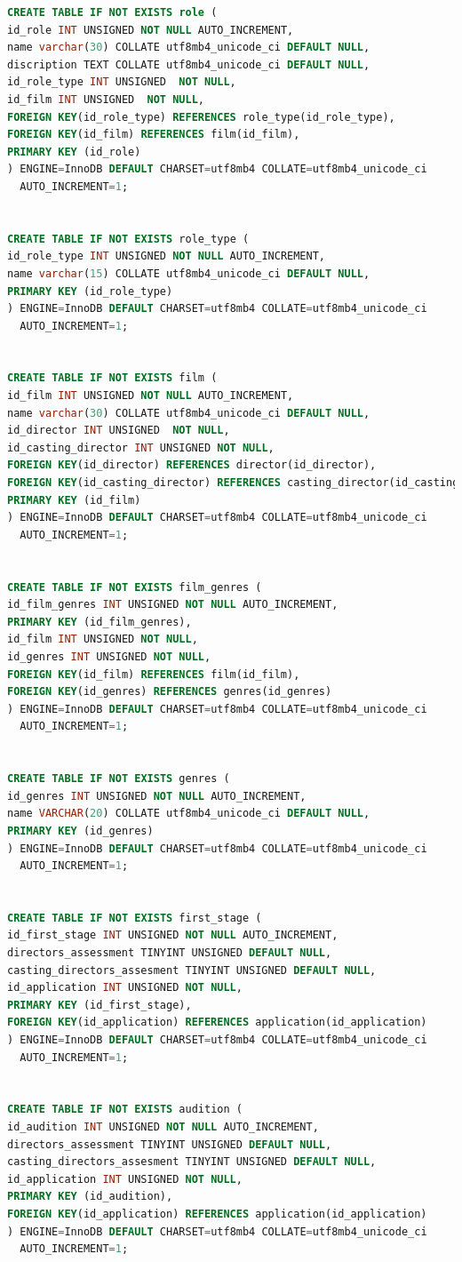 \documentclass[11pt,a4paper,final]{article} %
\begin{document}
\begin{lstlisting}[language=SQL]
CREATE TABLE IF NOT EXISTS role (
id_role INT UNSIGNED NOT NULL AUTO_INCREMENT,
name varchar(30) COLLATE utf8mb4_unicode_ci DEFAULT NULL,
discription TEXT COLLATE utf8mb4_unicode_ci DEFAULT NULL,
id_role_type INT UNSIGNED  NOT NULL, 
id_film INT UNSIGNED  NOT NULL, 
FOREIGN KEY(id_role_type) REFERENCES role_type(id_role_type),
FOREIGN KEY(id_film) REFERENCES film(id_film), 
PRIMARY KEY (id_role)
) ENGINE=InnoDB DEFAULT CHARSET=utf8mb4 COLLATE=utf8mb4_unicode_ci 
  AUTO_INCREMENT=1;


CREATE TABLE IF NOT EXISTS role_type (
id_role_type INT UNSIGNED NOT NULL AUTO_INCREMENT,
name varchar(15) COLLATE utf8mb4_unicode_ci DEFAULT NULL,
PRIMARY KEY (id_role_type)
) ENGINE=InnoDB DEFAULT CHARSET=utf8mb4 COLLATE=utf8mb4_unicode_ci   
  AUTO_INCREMENT=1;	


CREATE TABLE IF NOT EXISTS film (
id_film INT UNSIGNED NOT NULL AUTO_INCREMENT,
name varchar(30) COLLATE utf8mb4_unicode_ci DEFAULT NULL,
id_director INT UNSIGNED  NOT NULL, 
id_casting_director INT UNSIGNED NOT NULL,
FOREIGN KEY(id_director) REFERENCES director(id_director),
FOREIGN KEY(id_casting_director) REFERENCES casting_director(id_casting_director), 
PRIMARY KEY (id_film)
) ENGINE=InnoDB DEFAULT CHARSET=utf8mb4 COLLATE=utf8mb4_unicode_ci 
  AUTO_INCREMENT=1;


CREATE TABLE IF NOT EXISTS film_genres (
id_film_genres INT UNSIGNED NOT NULL AUTO_INCREMENT,
PRIMARY KEY (id_film_genres),
id_film INT UNSIGNED NOT NULL,
id_genres INT UNSIGNED NOT NULL,
FOREIGN KEY(id_film) REFERENCES film(id_film), 
FOREIGN KEY(id_genres) REFERENCES genres(id_genres) 
) ENGINE=InnoDB DEFAULT CHARSET=utf8mb4 COLLATE=utf8mb4_unicode_ci 
  AUTO_INCREMENT=1;


CREATE TABLE IF NOT EXISTS genres (
id_genres INT UNSIGNED NOT NULL AUTO_INCREMENT,
name VARCHAR(20) COLLATE utf8mb4_unicode_ci DEFAULT NULL,
PRIMARY KEY (id_genres)
) ENGINE=InnoDB DEFAULT CHARSET=utf8mb4 COLLATE=utf8mb4_unicode_ci 
  AUTO_INCREMENT=1;


CREATE TABLE IF NOT EXISTS first_stage (
id_first_stage INT UNSIGNED NOT NULL AUTO_INCREMENT,
directors_assessment TINYINT UNSIGNED DEFAULT NULL, 
casting_directors_assesment TINYINT UNSIGNED DEFAULT NULL,
id_application INT UNSIGNED NOT NULL,  
PRIMARY KEY (id_first_stage),
FOREIGN KEY(id_application) REFERENCES application(id_application) 
) ENGINE=InnoDB DEFAULT CHARSET=utf8mb4 COLLATE=utf8mb4_unicode_ci 
  AUTO_INCREMENT=1;


CREATE TABLE IF NOT EXISTS audition (
id_audition INT UNSIGNED NOT NULL AUTO_INCREMENT,
directors_assessment TINYINT UNSIGNED DEFAULT NULL, 
casting_directors_assesment TINYINT UNSIGNED DEFAULT NULL,
id_application INT UNSIGNED NOT NULL,  
PRIMARY KEY (id_audition),
FOREIGN KEY(id_application) REFERENCES application(id_application) 
) ENGINE=InnoDB DEFAULT CHARSET=utf8mb4 COLLATE=utf8mb4_unicode_ci 
  AUTO_INCREMENT=1;



\end{lstlisting}
\end{document}
